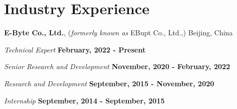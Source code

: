 \documentclass[letterpaper,11pt]{article}
\newcommand{\contentlength}{5.25in} %
\begin{document}
	
	\section{\textbf{Industry Experience}}
	\begin{tcolorbox}[flush right,breakable,colback=white,colframe=white,width=\contentlength]
		\textbf{E-Byte Co., Ltd.}, (\textit{formerly known as} EBupt Co., Ltd.,) Beijing, China
		
		\quad \textit{Technical Expert} \null\hfill \textbf{February, 2022 - Present}
		
		\quad \textit{Senior Research and Development} \null\hfill \textbf{November, 2020 - February, 2022}
		
		\quad \textit{Research and Development} \null\hfill \textbf{September, 2015 - November, 2020}
		
		\quad \textit{Internship} \null\hfill \textbf{September, 2014 - September, 2015}
		
	\end{tcolorbox}
	
	
\end{document}
